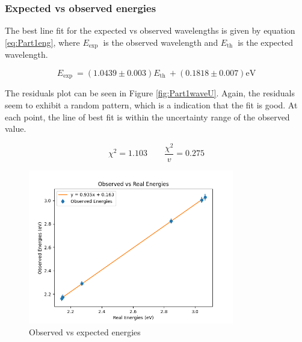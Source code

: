 \subsubsection{Expected vs observed energies}

The best line fit for the expected vs observed wavelengths is given by equation \ref{eq:Part1eng}, where $E_{\text {exp }}$ is the observed wavelength and $E_{\text {th }}$ is the expected wavelength.

\begin{equation}
    E_{\text {exp }} = (1.0439 \pm 0.003) E_{\text {th }} + (0.1818 \pm 0.007) \text{eV}
    \label{eq:Part1eng}
\end{equation}

The residuals plot can be seen in Figure \ref{fig:Part1waveU}. Again, the residuals seem to exhibit a random pattern, which is a indication that the fit is good. At each point, the line of best fit is within
the uncertainty range of the observed value.

\begin{equation}
    \chi^2 = 1.103 \qquad
    \frac{\chi^2}{v} = 0.275
\end{equation}


\begin{figure}[H]
    \centering
    \includegraphics[width=0.8\textwidth]{Results/Sections/Part1/Part1_energy_observed_vs_expected.png}
    \caption{Observed vs expected energies}
    \label{fig:Part1energy}
\end{figure}

